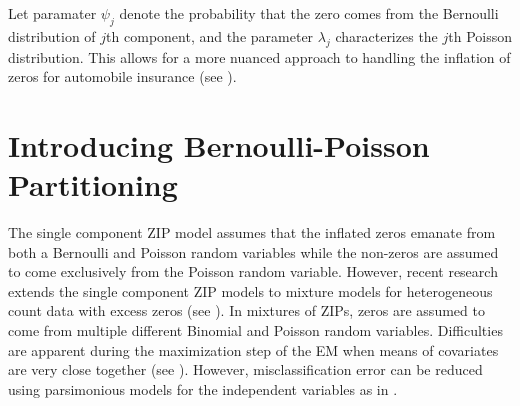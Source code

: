 \documentclass[11pt,letterpaper]{article}
\numberwithin{equation}{section}
\numberwithin{equation}{section}
\numberwithin{equation}{section}
\begin{document}
Let paramater $\psi_j$ denote the probability that the zero comes from the Bernoulli distribution of $j$th component, and the parameter $ \lambda_j $ characterizes the $j$th Poisson distribution. This allows for a more nuanced approach to handling the inflation of zeros for automobile insurance (see \cite{Bermudez+Karlis:2012}).
\section{Introducing Bernoulli-Poisson Partitioning}

The single component ZIP model assumes that the inflated zeros emanate from both a Bernoulli and Poisson random variables while the non-zeros are assumed to come exclusively from the Poisson random variable. However, recent research  extends the single component ZIP models to mixture models for heterogeneous count data with excess zeros (see  \cite{Bermudez+Karlis:2012}). In mixtures of ZIPs, zeros are assumed to come from multiple different Binomial and Poisson random variables. Difficulties are apparent  during the maximization step of the EM when means of covariates are very close together (see  \cite{LimHwa}). However, misclassification error can be reduced using parsimonious models for the independent variables as in  \cite{McNicholas:2010}.
\end{document}
